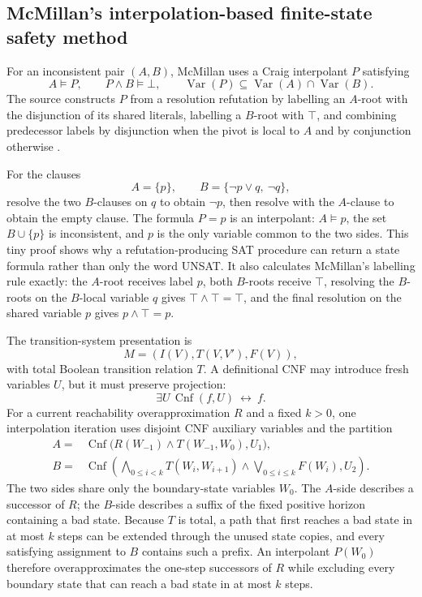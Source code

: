 
\subsection{McMillan's interpolation-based finite-state safety method}
\label{sec:p09-presentation-n-c-028}

For an inconsistent pair \((A,B)\), McMillan uses a Craig interpolant \(P\)
satisfying
\[
 A\models P,\qquad P\land B\models\bot,\qquad
 \operatorname{Var}(P)\subseteq
 \operatorname{Var}(A)\cap\operatorname{Var}(B).
\]
The source constructs \(P\) from a resolution refutation by labelling an
\(A\)-root with the disjunction of its shared literals, labelling a \(B\)-root
with \(\top\), and combining predecessor labels by disjunction when the pivot
is local to \(A\) and by conjunction otherwise
\cite[def.~2 and thm.~2]{McMillan2003}.

For the clauses
\[
 A=\{p\},\qquad
 B=\{\neg p\lor q,\ \neg q\},
\]
resolve the two \(B\)-clauses on \(q\) to obtain \(\neg p\), then resolve with
the \(A\)-clause to obtain the empty clause.  The formula \(P=p\) is an
interpolant: \(A\models p\), the set \(B\cup\{p\}\) is inconsistent, and \(p\)
is the only variable common to the two sides.  This tiny proof shows why a
refutation-producing SAT procedure can return a state formula rather than only
the word UNSAT.  It also calculates McMillan's labelling rule exactly: the
\(A\)-root receives label \(p\), both \(B\)-roots receive \(\top\), resolving
the \(B\)-roots on the \(B\)-local variable \(q\) gives
\(\top\land\top=\top\), and the final resolution on the shared variable \(p\)
gives \(p\land\top=p\).

The transition-system presentation is
\[
 M=(I(V),T(V,V'),F(V)),
\]
with total Boolean transition relation \(T\).  A definitional CNF may introduce
fresh variables \(U\), but it must preserve projection:
\[
 \exists U\,\operatorname{Cnf}(f,U)\ \leftrightarrow\ f.
\]
For a current reachability overapproximation \(R\) and a fixed \(k>0\), one
interpolation iteration uses disjoint CNF auxiliary variables and the partition
\[
\begin{aligned}
 A={}&\operatorname{Cnf}
   \bigl(R(W_{-1})\land T(W_{-1},W_0),U_1\bigr),\\
 B={}&\operatorname{Cnf}
   \left(
    \bigwedge_{0\leq i<k}T(W_i,W_{i+1})
    \land\bigvee_{0\leq i\leq k}F(W_i),U_2
   \right).
\end{aligned}
\]
The two sides share only the boundary-state variables \(W_0\).  The
\(A\)-side describes a successor of \(R\); the \(B\)-side describes a suffix of
the fixed positive horizon containing a bad state.  Because \(T\) is total, a
path that first reaches a bad state in at most \(k\) steps can be extended
through the unused state copies, and every satisfying assignment to \(B\)
contains such a prefix.  An interpolant \(P(W_0)\) therefore overapproximates
the one-step successors of \(R\) while excluding every boundary state that can
reach a bad state in at most \(k\) steps.

